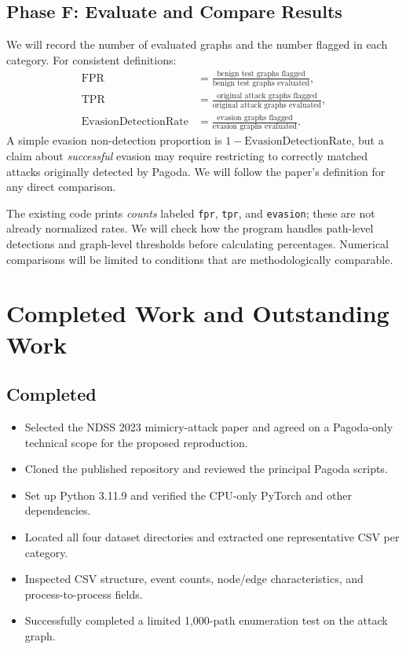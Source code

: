 \documentclass[11pt,letterpaper]{article}
\begin{document}
\subsection{Phase F: Evaluate and Compare Results}
We will record the number of evaluated graphs and the number flagged in each category. For consistent definitions:
\begin{align*}
\mathrm{FPR} &= \frac{\text{benign test graphs flagged}}{\text{benign test graphs evaluated}},\\
\mathrm{TPR} &= \frac{\text{original attack graphs flagged}}{\text{original attack graphs evaluated}},\\
\mathrm{EvasionDetectionRate} &= \frac{\text{evasion graphs flagged}}{\text{evasion graphs evaluated}}.
\end{align*}
A simple evasion non-detection proportion is $1-\mathrm{EvasionDetectionRate}$, but a claim about \emph{successful} evasion may require restricting to correctly matched attacks originally detected by Pagoda. We will follow the paper's definition for any direct comparison.

The existing code prints \emph{counts} labeled \texttt{fpr}, \texttt{tpr}, and \texttt{evasion}; these are not already normalized rates. We will check how the program handles path-level detections and graph-level thresholds before calculating percentages. Numerical comparisons will be limited to conditions that are methodologically comparable.

\section{Completed Work and Outstanding Work}
\subsection{Completed}
\begin{itemize}
\item Selected the NDSS 2023 mimicry-attack paper and agreed on a Pagoda-only technical scope for the proposed reproduction.
\item Cloned the published repository and reviewed the principal Pagoda scripts.
\item Set up Python 3.11.9 and verified the CPU-only PyTorch and other dependencies.
\item Located all four dataset directories and extracted one representative CSV per category.
\item Inspected CSV structure, event counts, node/edge characteristics, and process-to-process fields.
\item Successfully completed a limited 1,000-path enumeration test on the attack graph.
\end{itemize}
\end{document}
